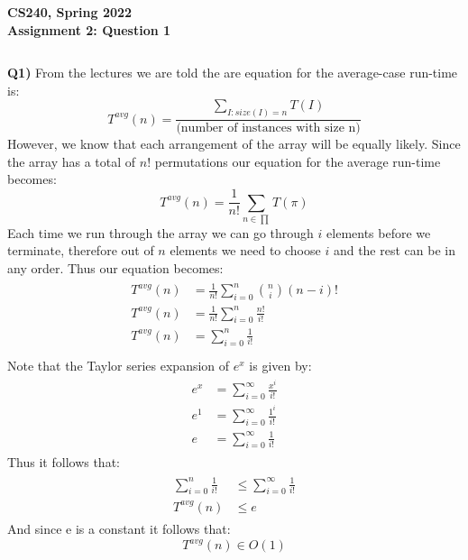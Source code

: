 \documentclass[12pt]{article}
\begin{document}
\begin{center}
{\Large\textbf{CS240, Spring 2022}}\\
\vspace{2mm}
{\Large\textbf{Assignment 2: Question 1}}\\
\vspace{3mm}
\end{center}
\[ \]
\begin{adjustwidth}{0em}{0pt}
\textbf{Q1)} From the lectures we are told the are equation for the average-case run-time is:
\[ T^{avg}(n) = \frac{\sum_{I:size(I)=n}T(I)}{\text{(number of instances with size n)}}\]
However, we know that each arrangement of the array will be equally likely. Since the array has a total of $n!$ permutations our equation for the average run-time becomes:
\[ T^{avg}(n) = \frac{1}{n!}\sum_{n \in \prod}T(\pi)\]
Each time we run through the array we can go through $i$ elements before we terminate, therefore out of $n$ elements we need to choose $i$ and the rest can be in any order. Thus our equation becomes:
\begin{align*}
    \begin{aligned}
       T^{avg}(n) &= \frac{1}{n!}\sum^{n}_{i = 0} {n \choose i} (n-i)! \\
       T^{avg}(n) &= \frac{1}{n!}\sum^{n}_{i = 0} \frac{n!}{i!} \\
       T^{avg}(n) &= \sum^{n}_{i = 0} \frac{1}{i!} \\
    \end{aligned}
\end{align*}
Note that the Taylor series expansion of $e^x$ is given by:
\begin{align*}
    \begin{aligned}
       e^x &= \sum^{\infty}_{i=0} \frac{x^i}{i!} \\
       e^1 &= \sum^{\infty}_{i=0} \frac{1^i}{i!} \\
       e &= \sum^{\infty}_{i=0} \frac{1}{i!} 
    \end{aligned}
\end{align*}
Thus it follows that:
\begin{align*}
    \begin{aligned}
       \sum^{n}_{i = 0} \frac{1}{i!} &\leq \sum^{\infty}_{i=0} \frac{1}{i!}\\
       T^{avg}(n) &\leq e
    \end{aligned}
\end{align*}
And since e is a constant it follows that:
\[ T^{avg}(n) \in O(1)\]

\end{adjustwidth} 
\end{document}
